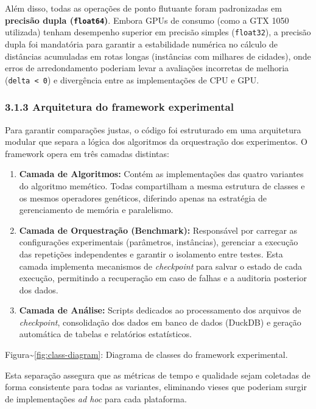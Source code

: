 Além disso, todas as operações de ponto flutuante foram padronizadas em
\textbf{precisão dupla (\texttt{float64})}. Embora GPUs de consumo (como
a GTX 1050 utilizada) tenham desempenho superior em precisão simples
(\texttt{float32}), a precisão dupla foi mandatória para garantir a
estabilidade numérica no cálculo de distâncias acumuladas em rotas
longas (instâncias com milhares de cidades), onde erros de
arredondamento poderiam levar a avaliações incorretas de melhoria
(\texttt{delta\ \textless{}\ 0}) e divergência entre as implementações
de CPU e GPU.

\subsubsection{3.1.3 Arquitetura do framework
experimental}\label{sec-313-arquitetura-framework}

Para garantir comparações justas, o código foi estruturado em uma
arquitetura modular que separa a lógica dos algoritmos da orquestração
dos experimentos. O framework opera em três camadas distintas:

\begin{enumerate}
\def\labelenumi{\arabic{enumi}.}
\tightlist
\item
  \textbf{Camada de Algoritmos:} Contém as implementações das quatro
  variantes do algoritmo memético. Todas compartilham a mesma estrutura
  de classes e os mesmos operadores genéticos, diferindo apenas na
  estratégia de gerenciamento de memória e paralelismo.
\item
  \textbf{Camada de Orquestração (Benchmark):} Responsável por carregar
  as configurações experimentais (parâmetros, instâncias), gerenciar a
  execução das repetições independentes e garantir o isolamento entre
  testes. Esta camada implementa mecanismos de \emph{checkpoint} para
  salvar o estado de cada execução, permitindo a recuperação em caso de
  falhas e a auditoria posterior dos dados.
\item
  \textbf{Camada de Análise:} Scripts dedicados ao processamento dos
  arquivos de \emph{checkpoint}, consolidação dos dados em banco de
  dados (DuckDB) e geração automática de tabelas e relatórios
  estatísticos.
\end{enumerate}

Figura\textasciitilde{}\ref{fig:class-diagram}: Diagrama de classes do
framework experimental.

Esta separação assegura que as métricas de tempo e qualidade sejam
coletadas de forma consistente para todas as variantes, eliminando
vieses que poderiam surgir de implementações \emph{ad hoc} para cada
plataforma.

